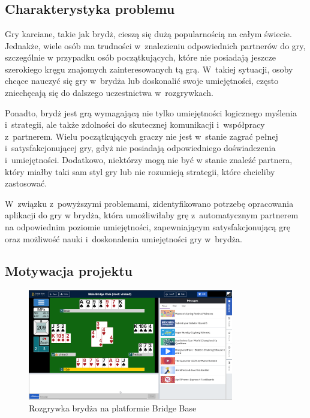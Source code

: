 \chapter{\ChapterTitleProjectVision}
\label{sec:cel-wizja}


\section{Charakterystyka problemu}

Gry karciane, takie jak brydż, cieszą się dużą popularnością na całym świecie.
Jednakże, wiele osób ma trudności w~znalezieniu odpowiednich partnerów do gry,
szczególnie w przypadku osób początkujących, które nie posiadają jeszcze
szerokiego kręgu znajomych zainteresowanych tą grą. W~takiej sytuacji, osoby
chcące nauczyć się gry w~brydża lub doskonalić swoje umiejętności, często
zniechęcają się do dalszego uczestnictwa w~rozgrywkach.

Ponadto, brydż jest grą wymagającą nie tylko umiejętności logicznego myślenia
i~strategii, ale także zdolności do skutecznej komunikacji i~współpracy
z~partnerem. Wielu początkujących graczy nie jest w~stanie zagrać pełnej
i~satysfakcjonującej gry, gdyż nie posiadają odpowiedniego doświadczenia
i~umiejętności. Dodatkowo, niektórzy mogą nie być w stanie znaleźć
partnera, który miałby taki sam styl gry lub nie rozumieją strategii,
które chcieliby zastosować.

W~związku z~powyższymi problemami, zidentyfikowano potrzebę opracowania
aplikacji do gry w brydża, która umożliwiłaby grę z~automatycznym
partnerem na odpowiednim poziomie umiejętności, zapewniającym satysfakcjonującą
grę oraz możliwość nauki i~doskonalenia umiejętności gry w~brydża.


\section{Motywacja projektu}

\begin{figure}
  \centering
  \includegraphics[width=0.8\textwidth]{img/brydz-platformy/bridgebase.png}
  \caption{Rozgrywka brydża na platformie Bridge Base}
  \label{fig:bridge-base}
\end{figure}

